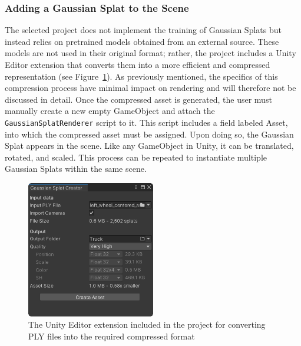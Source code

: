 \documentclass[12pt]{article}
\begin{document}
\subsubsection{Adding a Gaussian Splat to the Scene}
The selected project does not implement the training of Gaussian Splats but instead relies on pretrained models obtained from an external source. These models are not used in their original format; rather, the project includes a Unity Editor extension that converts them into a more efficient and compressed representation (see Figure~\ref{fig:creator}). As previously mentioned, the specifics of this compression process have minimal impact on rendering and will therefore not be discussed in detail. Once the compressed asset is generated, the user must manually create a new empty GameObject and attach the \texttt{GaussianSplatRenderer} script to it. This script includes a field labeled Asset, into which the compressed asset must be assigned. Upon doing so, the Gaussian Splat appears in the scene. Like any GameObject in Unity, it can be translated, rotated, and scaled. This process can be repeated to instantiate multiple Gaussian Splats within the same scene.
\begin{figure}[h!]
	\centering
	\includegraphics[width=0.5\textwidth]{Images/SplatCreator.png}
	\caption{The Unity Editor extension included in the project for converting PLY files into the required compressed format}
	\label{fig:creator}
\end{figure}
\end{document}
